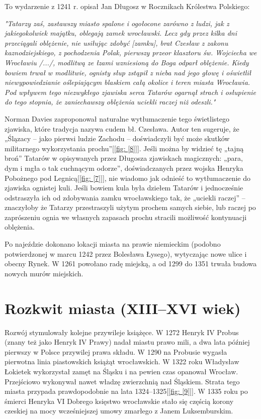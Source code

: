 \documentclass{article}
\begin{document}
To wydarzenie z 1241 r. opisał Jan Długosz w Rocznikach Królestwa Polskiego:

\textit{"Tatarzy zaś, zastawszy miasto spalone i ogołocone zarówno z ludzi, jak z jakiegokolwiek majątku, oblegają zamek wrocławski. Lecz gdy przez kilka dni przeciągali oblężenie, nie usiłując zdobyć [zamku], brat Czesław z zakonu kaznodziejskiego, z pochodzenia Polak, pierwszy przeor klasztoru św. Wojciecha we Wrocławiu /.../, modlitwą ze łzami wzniesioną do Boga odparł oblężenie. Kiedy bowiem trwał w modlitwie, ognisty słup zstąpił z nieba nad jego głowę i oświetlił niewypowiedzianie oślepiającym blaskiem całą okolice i teren miasta Wrocławia. Pod wpływem tego niezwykłego zjawiska serca Tatarów ogarnął strach i osłupienie do tego stopnia, że zaniechawszy oblężenia uciekli raczej niż odeszli."}

Norman Davies zaproponował naturalne wytłumaczenie tego świetlistego zjawiska, które tradycja nazywa cudem bł. Czesława. Autor ten sugeruje, że „Ślązacy – jako pierwsi ludzie Zachodu – doświadczyli być może skutków militarnego wykorzystania prochu”[\ref{fig: [8]}]. Jeśli można by widzieć tę „tajną broń” Tatarów w opisywanych przez Długosza zjawiskach magicznych: „para, dym i mgła o tak cuchnącym odorze”, doświadczanych przez wojska Henryka Pobożnego pod Legnicą[\ref{fig: [7]}], nie wiadomo jak odnieść to wytłumaczenie do zjawiska ognistej kuli. Jeśli bowiem kula była dziełem Tatarów i jednocześnie odstraszyła ich od zdobywania zamku wrocławskiego tak, że „uciekli raczej” – znaczyłoby że Tatarzy przestraszyli użytym prochem samych siebie, lub raczej po zaprószeniu ognia we własnych zapasach prochu stracili możliwość kontynuacji oblężenia.

Po najeździe dokonano lokacji miasta na prawie niemieckim (podobno potwierdzonej w marcu 1242 przez Bolesława Łysego), wytyczając nowe ulice i obecny Rynek. W 1261 powołano radę miejską, a od 1299 do 1351 trwała budowa nowych murów miejskich.


\section {Rozkwit miasta (XIII–XVI wiek)}
Rozwój stymulowały kolejne przywileje książęce. W 1272 Henryk IV Probus (znany też jako Henryk IV Prawy) nadał miastu prawo mili, a dwa lata później pierwszy w Polsce przywilej prawa składu. W 1290 na Probusie wygasła pierwotna linia piastowskich książąt wrocławskich. W 1322 roku Władysław Łokietek wykorzystał zamęt na Śląsku i na pewien czas opanował Wrocław. Przejściowo wykonywał nawet władzę zwierzchnią nad Śląskiem. Strata tego miasta przypada prawdopodobnie na lata 1324–1325[\ref{fig: [9]}]. W 1335 roku po śmierci Henryka VI Dobrego księstwo wrocławskie stało się częścią korony czeskiej na mocy wcześniejszej umowy zmarłego z Janem Luksemburskim.
\end{document}
